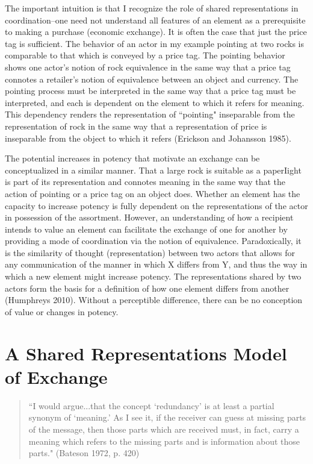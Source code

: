 The important intuition is that I recognize the role of shared representations in coordination--one need not understand all features of an element as a prerequisite to making a purchase (economic exchange). It is often the case that just the price tag is sufficient. The behavior of an actor in my example pointing at two rocks is comparable to that which is conveyed by a price tag. The pointing behavior shows one actor's notion of rock equivalence in the same way that a price tag connotes a retailer's notion of equivalence between an object and currency. The pointing process must be interpreted in the same way that a price tag must be interpreted, and each is dependent on the element to which it refers for meaning. This dependency renders the representation of ``pointing" inseparable from the representation of rock in the same way that a representation of price is inseparable from the object to which it refers (Erickson and Johansson 1985). 

The potential increases in potency that motivate an exchange can be conceptualized in a similar manner. That a large rock is suitable as a paperIight is part of its representation and connotes meaning in the same way that the action of pointing or a price tag on an object does. Whether an element has the capacity to increase potency is fully dependent on the representations of the actor in possession of the assortment. However, an understanding of how a recipient intends to value an element can facilitate the exchange of one for another by providing a mode of coordination via the notion of equivalence. Paradoxically, it is the similarity of thought (representation) between two actors that allows for any communication of the manner in which X differs from Y, and thus the way in which a new element might increase potency. The representations shared by two actors form the basis for a definition of how one element differs from another (Humphreys 2010). Without a perceptible difference, there can be no conception of value or changes in potency. 

\section{A Shared Representations Model of Exchange}
\begin{small}
\begin{quote}
 ``I would argue...that the concept `redundancy' is at least a partial synonym of `meaning.' As I see it, if the receiver can guess at missing parts of the message, then those parts which are received must, in fact, carry a meaning which refers to the missing parts and is information about those parts." (Bateson 1972, p. 420)
 \end{quote}
 \end{small}
 
